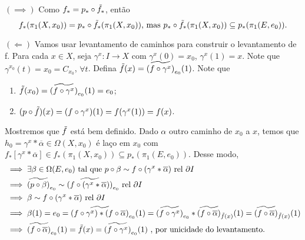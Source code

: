 \begin{dem}
    $(\implies)$ Como $f_{*} = p_{*} \circ \Tilde{f}_{*}$, então 
    $$ f_{*}(\pi_{1}(X, x_0)) = p_{*} \circ \Tilde{f}_{*}(\pi_{1}(X, x_0)) \text{, mas   } p_{*} \circ \Tilde{f}_{*}(\pi_{1}(X, x_0)) \subseteq p_{*}(\pi_{1}(E, e_0)).$$

    $(\Longleftarrow)$ Vamos usar levantamento de caminhos para construir o levantamento de f. Para cada $x \in X$, seja $\gamma^{x} : I \rightarrow X$ com $\gamma^{x} (0) = x_0$, $\gamma^{x}(1) = x$. Note que $\gamma^{x_0}(t) = x_0 = C_{x_0}$, $\forall t$. Defina $\Tilde{f}(x) = \widetilde{(f \circ \gamma^{x})}_{e_0} (1)$. Note que 
    


    \begin{enumerate}
        \item $\Tilde{f}(x_0) = \widetilde{(f \circ \gamma^{x})}_{e_0}(1) = e_0$;
        \item $(p \circ \Tilde{f})(x) = (f \circ \gamma^{x})(1) = f(\gamma^{x}(1)) = f(x)$.
    \end{enumerate}

    Mostremos que $\Tilde{f}$ está bem definido. Dado $\alpha$ outro caminho de $x_0$ a $x$, temos que $h_0 = \gamma^{x} \ast \overline{\alpha} \in \Omega(X, x_0)$ é laço em $x_0$ com $f_{*}[ \gamma^{x} \ast \overline{\alpha}] \in f_{*}(\pi_{1}(X, x_0)) \subseteq p_{*}(\pi_{1}(E, e_0))$. Desse modo,
    \begin{align*}
        &\implies \exists \beta \in \Omega(E, e_0) \text{ tal que } p \circ \beta \sim f \circ (\gamma^{x} \ast \overline{\alpha}) \text{ rel } \partial I \\
        &\implies \widetilde{(p \circ \beta)}_{e_0} \sim \widetilde{(f \circ (\gamma^{x} \ast \overline{\alpha}))}_{e_0} \text{ rel } \partial I \\
        &\implies \beta \sim f \circ (\gamma^{x} \ast \overline{\alpha}) \text{ rel } \partial I \\
        &\implies \beta(1) = e_0 = \widetilde{(f\circ\gamma^{x}) \ast (f \circ \overline{\alpha})}_{e_0}(1) = \widetilde{(f\circ\gamma^{x})}_{e_0} \ast \widetilde{(f \circ \overline{\alpha})}_{\Tilde{f}(x)} (1) = \widetilde{(f \circ \overline{\alpha})}_{\Tilde{f}(x)} (1) \\
        &\implies \widetilde{(f \circ \overline{\alpha})}_{e_0}(1) = \Tilde{f}(x) = \widetilde{(f \circ \gamma^{x})}_{e_0} (1) \text{ , por unicidade do levantamento.}
    \end{align*}


\end{dem}

